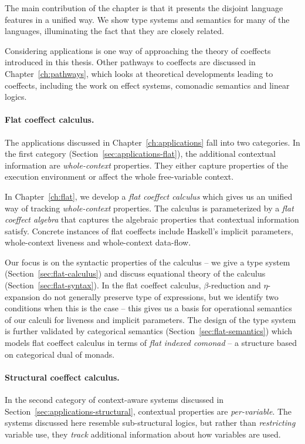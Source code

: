 The main contribution of the chapter is that it presents the disjoint language features in a 
unified way. We show type systems and semantics for many of the languages, illuminating
the fact that they are closely related. 

Considering applications is one way of approaching the theory of coeffects introduced in this thesis.
Other pathways to coeffects are discussed in Chapter~\ref{ch:pathways}, which looks at theoretical 
developments leading to coeffects, including the work on effect systems, comonadic semantics and 
linear logics.

\paragraph{Flat coeffect calculus.}
The applications discussed in Chapter~\ref{ch:applications} fall into two categories. In the first
category (Section~\ref{sec:applications-flat}), the additional contextual information are 
\emph{whole-context} properties. They either capture properties of the execution environment or
affect the whole free-variable context.

In Chapter~\ref{ch:flat}, we develop a \emph{flat coeffect calculus} which gives us an unified way
of tracking \emph{whole-context} properties. The calculus is parameterized by a \emph{flat coeffect
algebra} that captures the algebraic properties that contextual information satisfy. Concrete 
instances of flat coeffects include Haskell's implicit parameters, whole-context liveness and
whole-context data-flow. 

Our focus is on the syntactic properties of the calculus -- we give a type system 
(Section~\ref{sec:flat-calculus}) and discuss equational theory of the calculus (Section~\ref{sec:flat-syntax}).
In the flat coeffect calculus, $\beta$-reduction and $\eta$-expansion do not generally preserve
type of expressions, but we identify two conditions when this is the case -- this gives us
a basis for operational semantics of our calculi for liveness and implicit parameters. 
The design of the type system is further validated by categorical semantics
(Section~\ref{sec:flat-semantics}) which models flat coeffect calculus in terms of 
\emph{flat indexed comonad} -- a structure based on categorical dual of monads.

\paragraph{Structural coeffect calculus.}
In the second category of context-aware systems discussed in Section~\ref{sec:applications-structural},
contextual properties are \emph{per-variable}. The systems discussed here resemble sub-structural
logics, but rather than \emph{restricting} variable use, they \emph{track} additional information
about how variables are used.

